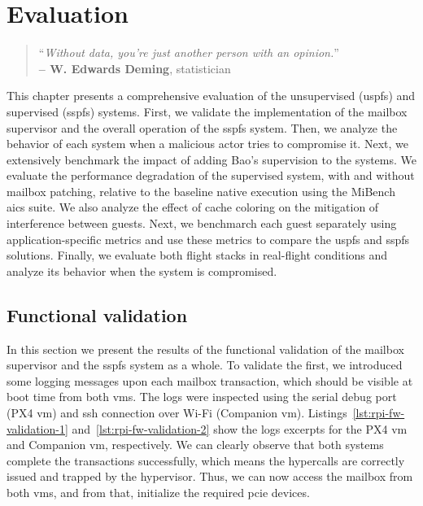 %
\chapter{Evaluation}
\label{cha:evaluation}
%
\begin{quote}
\begin{flushright}
``\emph{Without data, you're just another person with an opinion.}'' \\
\textbf{-- W. Edwards Deming}, statistician
\end{flushright}
\end{quote}

This chapter presents a comprehensive evaluation of the unsupervised
(\gls{uspfs}) and supervised (\gls{sspfs}) systems. First, we validate the
implementation of the mailbox supervisor and the overall operation of the
\gls{sspfs} system. Then, we analyze the behavior of each system when a malicious
actor tries to compromise it. Next, we extensively benchmark the impact of
adding Bao's supervision to the systems. We evaluate the performance degradation
of the supervised system, with and without mailbox patching, relative to the
baseline native execution using the MiBench \gls{aics} suite. We also analyze
the effect of cache coloring on the mitigation of interference between
guests. Next, we benchmarch each guest separately using application-specific
metrics and  use these metrics to compare the \gls{uspfs} and \gls{sspfs} solutions.
Finally, we evaluate both flight stacks in real-flight conditions and analyze
its behavior when the system is compromised.

\section{Functional validation}
In this section we present the results of the functional validation of the
mailbox supervisor and the \gls{sspfs} system as a whole. To validate the first,
we introduced some logging messages upon each mailbox transaction, which should
be visible at boot time from both \glspl{vm}. The logs were inspected using the
serial debug port (PX4 \gls{vm}) and \gls{ssh} connection over Wi-Fi (Companion \gls{vm}).
%
Listings~\ref{lst:rpi-fw-validation-1} and~\ref{lst:rpi-fw-validation-2} show
the logs excerpts for the PX4 \gls{vm} and Companion \gls{vm}, respectively. We can
clearly observe that both systems complete the transactions successfully, which
means the hypercalls are correctly issued and trapped by the hypervisor. Thus,
we can now access the mailbox from both \glspl{vm}, and from that, initialize
the required \gls{pcie} devices.

